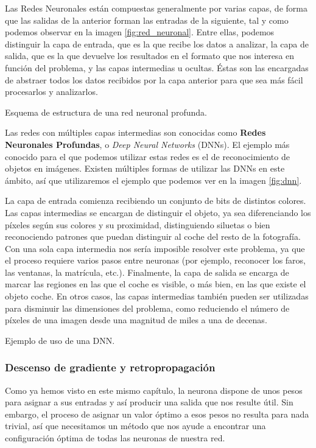 Las Redes Neuronales están compuestas generalmente por varias capas, de forma que las salidas de la anterior forman las entradas de la siguiente, tal y como podemos observar en la imagen \ref{fig:red_neuronal}. Entre ellas, podemos distinguir la capa de entrada, que es la que recibe los datos a analizar, la capa de salida, que es la que devuelve los resultados en el formato que nos interesa en función del problema, y las capas intermedias u ocultas. Éstas son las encargadas de abstraer todos los datos recibidos por la capa anterior para que sea más fácil procesarlos y analizarlos. 

%
       {Esquema de estructura de una red neuronal profunda.}

Las redes con múltiples capas intermedias son conocidas como \textbf{Redes Neuronales Profundas}, o \textit{Deep Neural Networks} (DNNs). El ejemplo más conocido para el que podemos utilizar estas redes es el de reconocimiento de objetos en imágenes. Existen múltiples formas de utilizar las DNNs en este ámbito, así que utilizaremos el ejemplo que podemos ver en la imagen \ref{fig:dnn}. 

La capa de entrada comienza recibiendo un conjunto de bits de distintos colores. Las capas intermedias se encargan de distinguir el objeto, ya sea diferenciando los píxeles según sus colores y su proximidad, distinguiendo siluetas o bien reconociendo patrones que puedan distinguir al coche del resto de la fotografía. Con una sola capa intermedia nos sería imposible resolver este problema, ya que el proceso requiere varios pasos entre neuronas (por ejemplo, reconocer los faros, las ventanas, la matrícula, etc.). Finalmente, la capa de salida se encarga de marcar las regiones en las que el coche es visible, o más bien, en las que existe el objeto coche. En otros casos, las capas intermedias también pueden ser utilizadas para disminuir las dimensiones del problema, como reduciendo el número de píxeles de una imagen desde una magnitud de miles a una de decenas.

%
       {Ejemplo de uso de una DNN.}    

\subsubsection{Descenso de gradiente y retropropagación}

Como ya hemos visto en este mismo capítulo, la neurona dispone de unos pesos para asignar a sus entradas y así producir una salida que nos resulte útil. Sin embargo, el proceso de asignar un valor óptimo a esos pesos no resulta para nada trivial, así que necesitamos un método que nos ayude a encontrar una configuración óptima de todas las neuronas de nuestra red.
 
